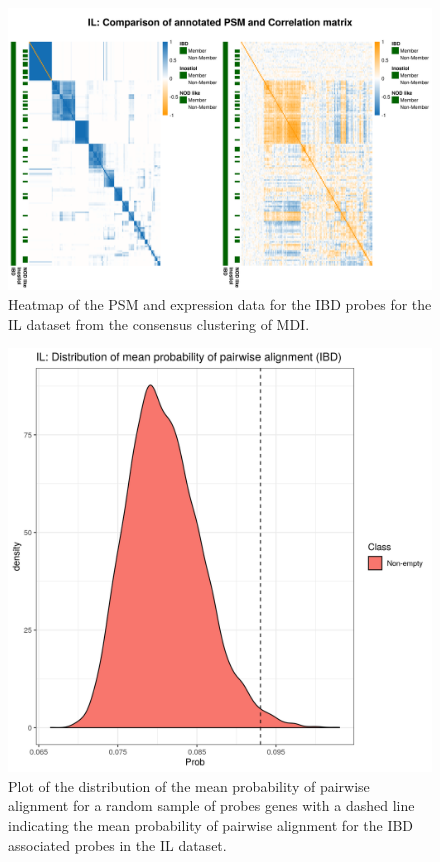 \documentclass[12pt]{article} %
\begin{document}
	\newpage
	
	\begin{figure}
		\centering
		\includegraphics[scale=0.75]{Images/Biology_data/Set_1000/All_datasets/Heatmaps/KEGG_INFLAMMATORY_BOWEL_DISEASE/IL_comp_psm_corr.png}
		\caption{Heatmap of the PSM and expression data for the IBD probes for the IL dataset from the consensus clustering of MDI.}
		\label{fig:results:cedar_2:mdi_il_ibd_psm_cor}
	\end{figure}
	
	
	\begin{figure}[h]
		\centering
		\includegraphics[scale=0.75]{Images/Biology_data/Set_1000/All_datasets/Mean_alignment_probability/IL_KEGG_INFLAMMATORY_BOWEL_DISEASE.png}
		\caption{Plot of the distribution of the mean probability of pairwise alignment for a random sample of probes genes with a dashed line indicating the mean probability of pairwise alignment for the IBD associated probes in the IL dataset.}
		\label{fig:results:cedar_2:mdi_il_ibd_alignment_prob_distn}
	\end{figure}
	
\end{document}
